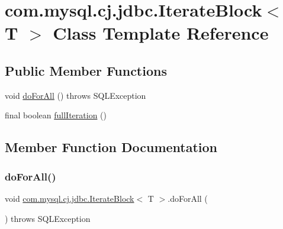 \hypertarget{classcom_1_1mysql_1_1cj_1_1jdbc_1_1_iterate_block}{}\section{com.\+mysql.\+cj.\+jdbc.\+Iterate\+Block$<$ T $>$ Class Template Reference}
\label{classcom_1_1mysql_1_1cj_1_1jdbc_1_1_iterate_block}
\subsection*{Public Member Functions}
\begin{DoxyCompactItemize}
\item 
void \mbox{\hyperlink{classcom_1_1mysql_1_1cj_1_1jdbc_1_1_iterate_block_a548a66ba2491af3b82c27b9120b30476}{do\+For\+All}} ()  throws S\+Q\+L\+Exception 
\item 
final boolean \mbox{\hyperlink{classcom_1_1mysql_1_1cj_1_1jdbc_1_1_iterate_block_a5969692e9d396a55847ad80abd25bfc3}{full\+Iteration}} ()
\end{DoxyCompactItemize}


\subsection{Member Function Documentation}
\mbox{\label{classcom_1_1mysql_1_1cj_1_1jdbc_1_1_iterate_block_a548a66ba2491af3b82c27b9120b30476}} 
\subsubsection{\texorpdfstring{do\+For\+All()}{doForAll()}}
{\footnotesize\ttfamily void \mbox{\hyperlink{classcom_1_1mysql_1_1cj_1_1jdbc_1_1_iterate_block}{com.\+mysql.\+cj.\+jdbc.\+Iterate\+Block}}$<$ T $>$.do\+For\+All (\begin{DoxyParamCaption}{ }\end{DoxyParamCaption}) throws S\+Q\+L\+Exception}

\mbox{\label{classcom_1_1mysql_1_1cj_1_1jdbc_1_1_iterate_block_a5969692e9d396a55847ad80abd25bfc3}} 

